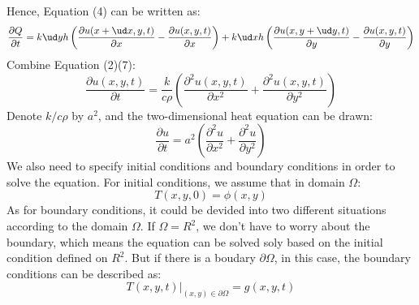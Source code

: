 Hence, Equation (4) can be written as:
\begin{equation}
\frac{\partial Q}{\partial t}=k\ud yh\left(\frac{\partial u(x+\ud x,y,t)}{\partial x}-\frac{\partial u(x,y,t)}{\partial x}\right)+k\ud xh\left(\frac{\partial u(x,y+\ud y,t)}{\partial y}-\frac{\partial u(x,y,t)}{\partial y}\right)
\end{equation}
Combine Equation (2)(7):
\begin{equation}
\frac{\partial u(x,y,t)}{\partial t}=\frac{k}{c\rho}\left(\frac{\partial ^2 u(x,y,t)}{\partial x^2}+\frac{\partial ^2 u(x,y,t)}{\partial y^2}\right)
\end{equation}
Denote $k/c\rho$ by $a^2$, and the two-dimensional heat equation can be drawn:
\begin{equation}
\frac{\partial u}{\partial t}=a^2\left(\frac{\partial ^2 u}{\partial x^2}+\frac{\partial ^2 u}{\partial y^2}\right)
\end{equation}
We also need to specify initial conditions and boundary conditions in order to solve the equation. For initial conditions, we assume that in domain $\Omega$:
\begin{equation}
T(x,y,0)=\phi(x,y) 
\end{equation}
As for boundary conditions, it could be devided into two different situations according to the domain $\Omega$. If $\Omega=R^2$, we don't have to worry about the boundary, which means the equation can be solved soly based on the initial condition defined on $R^2$. But if there is a boudary $\partial\Omega$, in this case, the boundary conditions can be described as: 
\begin{equation}
T(x,y,t)|_{(x,y)\in\partial\Omega} =g(x,y,t) 
\end{equation}
